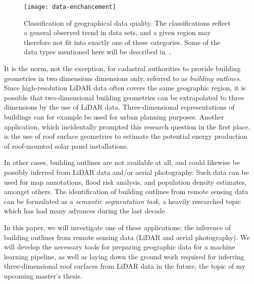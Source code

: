 \begin{figure}[htb]
  \texttt{[image: data-enchancement]}
  \caption{
    Classification of geographical data quality.
    The classifications reflect a general observed trend in data sets, and a given region may therefore not fit into exactly one of these categories.
    Some of the data types mentioned here will be described in~.
  }%
  \label{fig:data-enchancement}
\end{figure}

It is the norm, not the exception, for cadastral authorities to provide building geometries in two dimensions dimensions only, referred to as \textit{building outlines}.
Since high-resolution LiDAR data often covers the same geographic region, it is possible that two-dimensional building geometries can be extrapolated to three dimensions by the use of LiDAR data.
Three-dimensional representations of buildings can for example be used for urban planning purposes.
Another application, which incidentally prompted this research question in the first place, is the use of roof surface geometries to estimate the potential energy production of roof-mounted solar panel installations.

In other cases, building outlines are not available at all, and could likewise be possibly inferred from LiDAR data and/or aerial photography.
Such data can be used for map annotations, flood risk analysis, and population density estimates, amongst others.
The identification of building outlines from remote sensing data can be formulated as a \textit{semantic segmentation task}, a heavily researched topic which has had many advances during the last decade.

In this paper, we will investigate one of these applications; the inference of building outlines from remote sensing data (LiDAR and aerial photography).
We will develop the necessary tools for preparing geographic data for a machine learning pipeline, as well as laying down the ground work required for inferring three-dimensional roof surfaces from LiDAR data in the future, the topic of my upcoming master's thesis.



